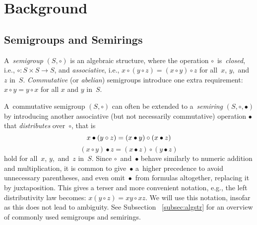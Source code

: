 \documentclass[11pt,letterpaper]{article}
\begin{document}
\section{Background}
\subsection{Semigroups and Semirings}
A~\emph{semigroup} $(S, \circ)$ is an algebraic structure, where 
the operation
$\circ$~is~\emph{closed}, i.e., $\circ : S\times S \rightarrow S$, 
and
\emph{associative}, i.e.,
$x \circ (y \circ z) = (x \circ y) \circ z$ for all~$x$, $y$,~and~$z$ 
in~$S$.
\emph{Commutative} (or \emph{abelian}) semigroups introduce 
one extra requirement: $x \circ y = y \circ x$ for all $x$ and $y$ 
in~$S$.

A~commutative semigroup $(S, \circ)$ can often be extended to 
a~\emph{semiring} $(S, \circ, \bullet)$ by introducing 
another associative (but not necessarily
commutative) 
operation $\bullet$ that \emph{distributes} over~$\circ$, that is
\[
x \bullet (y \circ z) = (x \bullet y) \circ (x \bullet z)\\
\]
\[
(x \circ y) \bullet z = (x \bullet z) \circ (y \bullet z)
\]
hold for all~$x$, $y$,~and~$z$ in~$S$. 
Since $\circ$~and~$\bullet$ behave
similarly to numeric addition and multiplication, it is common to
give~$\bullet$ a~higher precedence to avoid 
unnecessary parentheses, and even omit~$\bullet$~from
formulas altogether, replacing it by juxtaposition. 
This gives a terser and
more convenient notation, e.g., the left distributivity law becomes:
$x (y \circ z) = x y \circ x z$. We will use this notation, 
insofar as this does not lead to ambiguity. See Subsection~
\ref{subsec:algstr} for an overview of commonly used 
semigroups and semirings.
\end{document}

